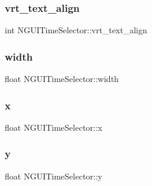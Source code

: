 \hypertarget{class_n_g_u_i_time_selector_a899b86d02ae44be7a30e6770565d5625}{}\label{class_n_g_u_i_time_selector_a899b86d02ae44be7a30e6770565d5625} 
\subsubsection{\texorpdfstring{vrt\+\_\+text\+\_\+align}{vrt\_text\_align}}
{\footnotesize\ttfamily int N\+G\+U\+I\+Time\+Selector\+::vrt\+\_\+text\+\_\+align}

\hypertarget{class_n_g_u_i_time_selector_a715d3d3abc503e723ee245ecaf7a5c3b}{}\label{class_n_g_u_i_time_selector_a715d3d3abc503e723ee245ecaf7a5c3b} 
\subsubsection{\texorpdfstring{width}{width}}
{\footnotesize\ttfamily float N\+G\+U\+I\+Time\+Selector\+::width}

\hypertarget{class_n_g_u_i_time_selector_a4d188fa85d9317b64fbb8ff2e0a77c23}{}\label{class_n_g_u_i_time_selector_a4d188fa85d9317b64fbb8ff2e0a77c23} 
\subsubsection{\texorpdfstring{x}{x}}
{\footnotesize\ttfamily float N\+G\+U\+I\+Time\+Selector\+::x}

\hypertarget{class_n_g_u_i_time_selector_a88b312afca64a857fa9884441657303b}{}\label{class_n_g_u_i_time_selector_a88b312afca64a857fa9884441657303b} 
\subsubsection{\texorpdfstring{y}{y}}
{\footnotesize\ttfamily float N\+G\+U\+I\+Time\+Selector\+::y}

